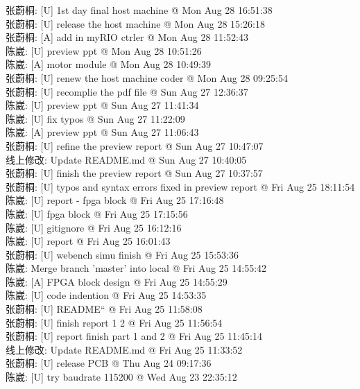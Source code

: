 \documentclass[a4paper]{paper}
\begin{document}
张蔚桐: [U] 1st day final host machine @ Mon Aug 28 16:51:38\\ 
张蔚桐: [U] release the host machine @ Mon Aug 28 15:26:18\\ 
张蔚桐: [A] add in myRIO ctrler @ Mon Aug 28 11:52:43\\ 
陈崴: [U] preview ppt @ Mon Aug 28 10:51:26\\ 
陈崴: [A] motor module @ Mon Aug 28 10:49:39\\ 
张蔚桐: [U] renew the host machine coder @ Mon Aug 28 09:25:54\\ 
张蔚桐: [U] recomplie the pdf file @ Sun Aug 27 12:36:37\\ 
陈崴: [U] preview ppt @ Sun Aug 27 11:41:34\\ 
陈崴: [U] fix typos @ Sun Aug 27 11:22:09\\  
陈崴: [A] preview ppt @ Sun Aug 27 11:06:43\\  
张蔚桐: [U] refine the preview report @ Sun Aug 27 10:47:07\\ 
线上修改: Update README.md @ Sun Aug 27 10:40:05\\ 
张蔚桐: [U] finish the preview report @ Sun Aug 27 10:37:57\\ 
张蔚桐: [U] typos and syntax errors fixed in preview report @ Fri Aug 25 18:11:54\\ 
陈崴: [U] report - fpga block @ Fri Aug 25 17:16:48\\ 
陈崴: [U] fpga block @ Fri Aug 25 17:15:56\\ 
陈崴: [U] gitignore @ Fri Aug 25 16:12:16\\  
陈崴: [U] report @ Fri Aug 25 16:01:43\\ 
张蔚桐: [U] webench simu finish @ Fri Aug 25 15:53:36\\ 
陈崴: Merge branch 'master' into local @ Fri Aug 25 14:55:42\\ 
陈崴: [A] FPGA block design @ Fri Aug 25 14:55:29\\ 
陈崴: [U] code indention @ Fri Aug 25 14:53:35\\ 
张蔚桐: [U] README“ @ Fri Aug 25 11:58:08\\ 
张蔚桐: [U] finish report 1 2 @ Fri Aug 25 11:56:54\\ 
张蔚桐: [U] report finish part 1 and 2 @ Fri Aug 25 11:45:14\\ 
线上修改: Update README.md @ Fri Aug 25 11:33:52\\ 
张蔚桐: [U] release PCB @ Thu Aug 24 09:17:36\\ 
陈崴: [U] try baudrate 115200 @ Wed Aug 23 22:35:12\\ 
\end{document}
